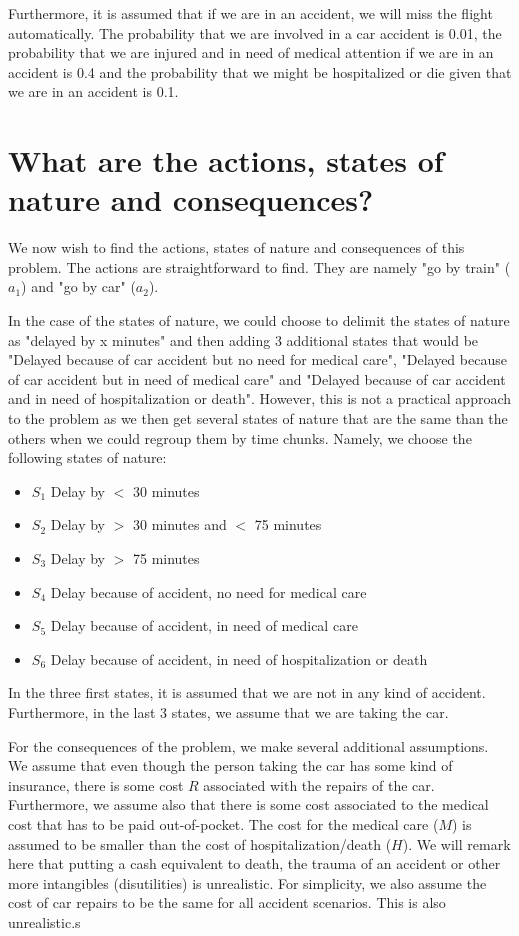\documentclass[letterpaper,12pt]{article}
\begin{document}
Furthermore, it is assumed that if we are in an accident, we will miss the flight automatically. The probability that we are involved in a car accident is 0.01, the probability that we are injured and in need of medical attention if we are in an accident is 0.4 and the probability that we might be hospitalized or die given that we are in an accident is 0.1.

\section{What are the actions, states of nature and consequences?}

We now wish to find the actions, states of nature and consequences of this problem. The actions are straightforward to find. They are namely "go by train" ($a_1$) and "go by car" ($a_2$).

In the case of the states of nature, we could choose to delimit the states of nature as "delayed by x minutes" and then adding 3 additional states that would be "Delayed because of car accident but no need for medical care", "Delayed because of car accident but in need of medical care" and "Delayed because of car accident and in need of hospitalization or death". However, this is not a practical approach to the problem as we then get several states of nature that are the same than the others when we could regroup them by time chunks. Namely, we choose the following states of nature:

\begin{itemize}
	\item $S_1$ Delay by $<$ 30 minutes
	\item $S_2$ Delay by $>$ 30 minutes and $<$ 75 minutes
	\item $S_3$ Delay by $>$ 75 minutes
	\item $S_4$ Delay because of accident, no need for medical care
	\item $S_5$ Delay because of accident, in need of medical care
	\item $S_6$ Delay because of accident, in need of hospitalization or death
\end{itemize}

In the three first states, it is assumed that we are not in any kind of accident. Furthermore, in the last 3 states, we assume that we are taking the car.

For the consequences of the problem, we make several additional assumptions. We assume that even though the person taking the car has some kind of insurance, there is some cost $R$ associated with the repairs of the car. Furthermore, we assume also that there is some cost associated to the medical cost that has to be paid out-of-pocket. The cost for the medical care ($M$) is assumed to be smaller than the cost of hospitalization/death ($H$). We will remark here that putting a cash equivalent to death, the trauma of an accident or other more intangibles (disutilities) is unrealistic. For simplicity, we also assume the cost of car repairs to be the same for all accident scenarios. This is also unrealistic.s
\end{document}

